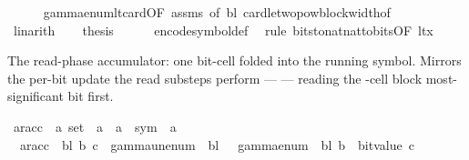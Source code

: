\begin{isabellebody}
\ \ \ \ \isamarkupfalse%
\ gamma{\isacharunderscore}{\kern0pt}enum{\isacharunderscore}{\kern0pt}lt{\isacharunderscore}{\kern0pt}card{\isacharbrackleft}{\kern0pt}OF\ assms{\isacharcomma}{\kern0pt}\ of\ bl{\isacharbrackright}{\kern0pt}\ card{\isacharunderscore}{\kern0pt}le{\isacharunderscore}{\kern0pt}two{\isacharunderscore}{\kern0pt}pow{\isacharunderscore}{\kern0pt}block{\isacharunderscore}{\kern0pt}width{\isacharbrackleft}{\kern0pt}of\ {\isasymGamma}{\isacharbrackright}{\kern0pt}\isanewline
\ \ \ \ \isamarkupfalse%
\ linarith\isanewline
\ \ \isamarkupfalse%
\ {\isacharquery}{\kern0pt}thesis\isanewline
\ \ \ \ \isamarkupfalse%
\ encode{\isacharunderscore}{\kern0pt}symbol{\isacharunderscore}{\kern0pt}def\ \isamarkupfalse%
\ {\isacharparenleft}{\kern0pt}rule\ bits{\isacharunderscore}{\kern0pt}to{\isacharunderscore}{\kern0pt}nat{\isacharunderscore}{\kern0pt}nat{\isacharunderscore}{\kern0pt}to{\isacharunderscore}{\kern0pt}bits{\isacharbrackleft}{\kern0pt}OF\ lt{\isacharunderscore}{\kern0pt}x{\isacharbrackright}{\kern0pt}{\isacharparenright}{\kern0pt}\isanewline
{}\isamarkupfalse%
%
\endisatagproof
{\isafoldproof}%
%
\isadelimproof
%
\endisadelimproof
%
\begin{isamarkuptext}%
The read-phase accumulator: one bit-cell folded into the
  running symbol.  Mirrors the per-bit update the read substeps
  perform —  — reading the -cell block most-significant
  bit first.%
\end{isamarkuptext}\isamarkuptrue%
\isamarkupfalse%
\ ar{\isacharunderscore}{\kern0pt}acc\ {\isacharcolon}{\kern0pt}{\isacharcolon}{\kern0pt}\ {\isachardoublequoteopen}{\isacharprime}{\kern0pt}a\ set\ {\isasymRightarrow}\ {\isacharprime}{\kern0pt}a\ {\isasymRightarrow}\ {\isacharprime}{\kern0pt}a\ {\isasymRightarrow}\ sym{}\ {\isasymRightarrow}\ {\isacharprime}{\kern0pt}a{\isachardoublequoteclose}\ \isanewline
\ \ {\isachardoublequoteopen}ar{\isacharunderscore}{\kern0pt}acc\ {\isasymGamma}\ bl\ b\ c\ {\isacharequal}{\kern0pt}\ gamma{\isacharunderscore}{\kern0pt}unenum\ {\isasymGamma}\ bl\ {\isacharparenleft}{\kern0pt}{}\ {\isacharasterisk}{\kern0pt}\ gamma{\isacharunderscore}{\kern0pt}enum\ {\isasymGamma}\ bl\ b\ {\isacharplus}{\kern0pt}\ bit{\isacharunderscore}{\kern0pt}value\ c{\isacharparenright}{\kern0pt}{\isachardoublequoteclose}%

\end{isabellebody}
